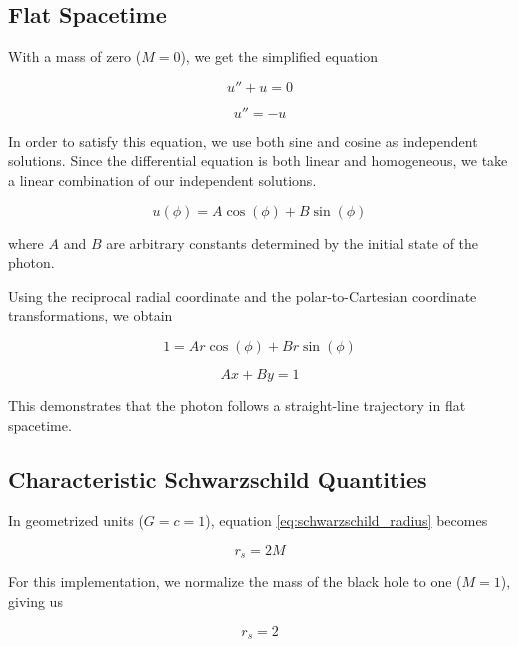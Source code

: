 \documentclass[12pt]{article}
\numberwithin{equation}{section}
\begin{document}
\subsection{Flat Spacetime}

With a mass of zero ($M = 0$), we get the simplified 
equation

\begin{equation}
    u'' + u = 0
\end{equation}

\begin{equation}
    u'' = -u
\end{equation}

In order to satisfy this equation, we use both sine and 
cosine as independent solutions. Since the differential 
equation is both linear and homogeneous, we take a linear 
combination of our independent solutions.

\begin{equation}
    u(\phi) = A\cos(\phi) + B\sin(\phi)
\end{equation}

where $A$ and $B$ are arbitrary constants determined by 
the initial state of the photon.

Using the reciprocal radial coordinate and the 
polar-to-Cartesian coordinate transformations, we obtain

\begin{equation}
    1 = Ar\cos(\phi) + Br\sin(\phi)
\end{equation}

\begin{equation}
    Ax + By = 1
\end{equation}

This demonstrates that the photon follows a straight-line 
trajectory in flat spacetime.

\subsection{Characteristic Schwarzschild Quantities}

In geometrized units ($G = c = 1$), equation 
\eqref{eq:schwarzschild_radius} becomes

\begin{equation}
    r_s = 2M
\end{equation}

For this implementation, we normalize the mass of the 
black hole to one ($M = 1$), giving us

\begin{equation}
    r_s = 2
\end{equation}
\end{document}
